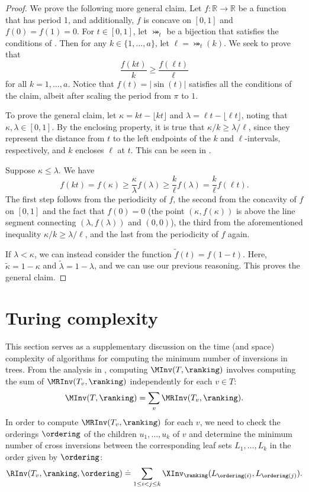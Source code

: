 \begin{proof}
    We prove the following more general claim. Let $f:\mathbb{R}\to\mathbb{R}$ be a function that has period 1, and additionally, $f$ is concave on $[0,1]$ and $f(0)=f(1)=0$. For $t\in [0,1]$, let $\bij_t$ be a bijection that satisfies the conditions of . Then for any $k\in \{1,\dots,a\}$, let $\ell=\bij_t(k)$. We seek to prove that 
    \[\frac{f(kt)}{k}\ge \frac{f(\ell t)}{\ell} \]
    for all $k=1,\dots,a$. Notice that $f(t)=\lvert\sin(t)\rvert$ satisfies all the conditions of the claim, albeit after scaling the period from $\pi$ to $1$.
    
    To prove the general claim, let $\kappa=kt-\lfloor kt\rfloor$ and $\lambda=\ell t-\lfloor \ell t\rfloor$, noting that $\kappa,\lambda\in [0,1]$. By the enclosing property, it is true that $\kappa/k \ge \lambda/\ell$, since they represent the distance from $t$ to the left endpoints of the $k$ and $\ell$-intervals, respectively, and $k$ encloses $\ell$ at $t$. This can be seen in .
    
    Suppose $\kappa\le \lambda$. We have 
    \[f(kt)=f(\kappa) \ge \frac{\kappa}{\lambda}f(\lambda)\ge \frac{k}{\ell}f(\lambda)=\frac{k}{\ell}f(\ell t). \]
    The first step follows from the periodicity of $f$, the second from the concavity of $f$ on $[0,1]$ and the fact that $f(0)=0$ (the point $(\kappa,f(\kappa))$ is above the line segment connecting $(\lambda,f(\lambda))$ and $(0,0)$), the third from the aforementioned inequality $\kappa/k \ge \lambda/\ell$, and the last from the periodicity of $f$ again. 
    
    If $\lambda<\kappa$, we can instead consider the function $\widetilde{f}(t)=f(1-t)$. Here, $\widetilde{\kappa}=1-\kappa$ and $\widetilde{\lambda}=1-\lambda$, and we can use our previous reasoning. This proves the general claim.
\end{proof}



\section{Turing complexity}
\label{sec:turing}

This section serves as a supplementary discussion on the time (and space) complexity of algorithms for computing the minimum number of inversions in trees. From the analysis in , computing $\MInv(T,\ranking)$ involves computing the sum of $\MRInv(T_v,\ranking)$ independently for each $v\in T$:
\begin{equation*}
   \MInv(T,\ranking) = \sum_v \MRInv(T_v,\ranking).
\end{equation*}
In order to compute $\MRInv(T_v,\ranking)$ for each $v$, we need to check the orderings $\ordering$ of the children $u_1, \dots, u_k$ of $v$ and determine the minimum number of cross inversions between the corresponding leaf sets $L_1,\dots,L_k$ in the order given by $\ordering$:
\begin{equation*}
    \RInv(T_v,\ranking,\ordering) \doteq \sum_{1 \le i < j \le k} \XInv_\ranking(L_{\ordering(i)},L_{\ordering(j)}).
\end{equation*}

